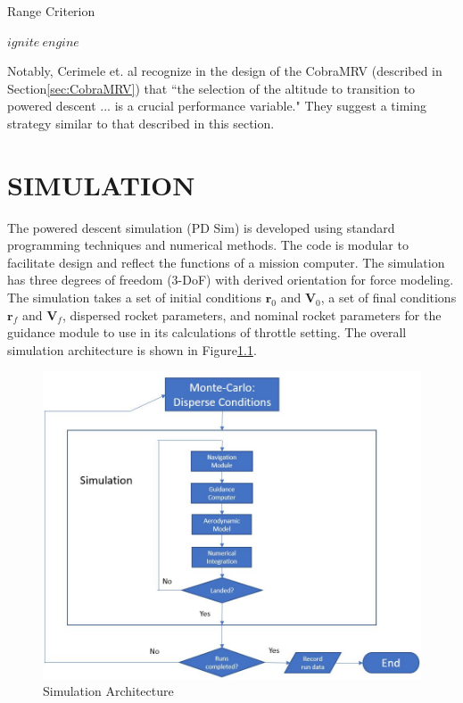 \begin{algorithm}
	\caption{Range Criterion}
	\label{eqn:rangecriterion}
	\begin{algorithmic}[1]
			\State $ ignite\: engine $
		\EndIf
	\end{algorithmic}
\end{algorithm}

Notably, Cerimele et. al\:\cite{CERIMELE} recognize in the design of the CobraMRV (described in Section\:\ref{sec:CobraMRV}) that ``the selection of the altitude to transition to powered descent ... is a crucial performance variable." They suggest a timing strategy similar to that described in this section.

\chapter{SIMULATION} \label{chap:simulation}

The powered descent simulation (PD Sim) is developed using standard programming techniques and numerical methods. The code is modular to facilitate design and reflect the functions of a mission computer. The simulation has three degrees of freedom (3-DoF) with derived orientation for force modeling. The simulation takes a set of initial conditions $\bm{r}_0$ and $\bm{V}_0$, a set of final conditions $\bm{r}_f$ and $\bm{V}_f$, dispersed rocket parameters, and nominal rocket parameters for the guidance module to use in its calculations of throttle setting. The overall simulation architecture is shown in Figure\:\ref{fig:simarch}.

\begin{figure}[H]
	\centering
	\begin{minipage}{4.3 in}
		\includegraphics[width=\linewidth]{Figures/simarch.jpg}
		\caption{Simulation Architecture \label{fig:simarch} }
	\end{minipage}
\end{figure}


